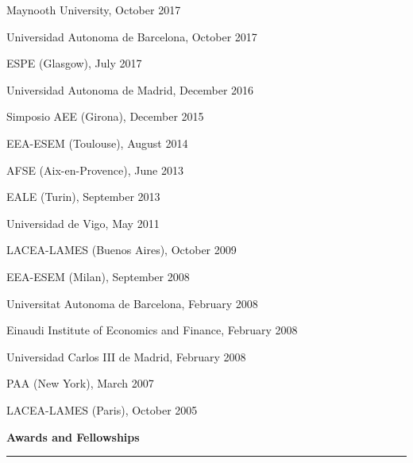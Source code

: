 \documentclass[12pt]{article}
\newcommand{\NewPart}[1]{ \vspace*{0.4cm} \noindent \large \textbf{#1}
\par \normalsize \normalfont \vspace*{-0.5cm} \noindent\rule{\textwidth}{1.8pt} \vspace*{-0.75cm} }
\newcommand{\ConferenceEntry}[2]{
		\noindent
		#1		   %
		\hspace{0em} #2 \par}     %
\begin{document}
\ConferenceEntry{Maynooth University, October 2017}

\ConferenceEntry{Universidad Autonoma de Barcelona, October 2017}

\ConferenceEntry{ESPE (Glasgow), July 2017}

\ConferenceEntry{Universidad Autonoma de Madrid, December 2016}

\ConferenceEntry{Simposio AEE (Girona), December 2015}

\ConferenceEntry{EEA-ESEM (Toulouse), August 2014}

\ConferenceEntry{AFSE (Aix-en-Provence), June 2013}

\ConferenceEntry{EALE (Turin), September 2013}

\ConferenceEntry{Universidad de Vigo, May 2011}

\ConferenceEntry{LACEA-LAMES (Buenos Aires), October 2009}

\ConferenceEntry{EEA-ESEM (Milan), September 2008}

\ConferenceEntry{Universitat Autonoma de Barcelona, February 2008}

\ConferenceEntry{Einaudi Institute of Economics and Finance, February 2008} 

\ConferenceEntry{Universidad Carlos III de Madrid, February 2008} 

\ConferenceEntry{PAA (New York), March 2007}

\ConferenceEntry{LACEA-LAMES (Paris), October 2005}


%
%
%
%
%

\NewPart{Awards and Fellowships}{}
\end{document}
